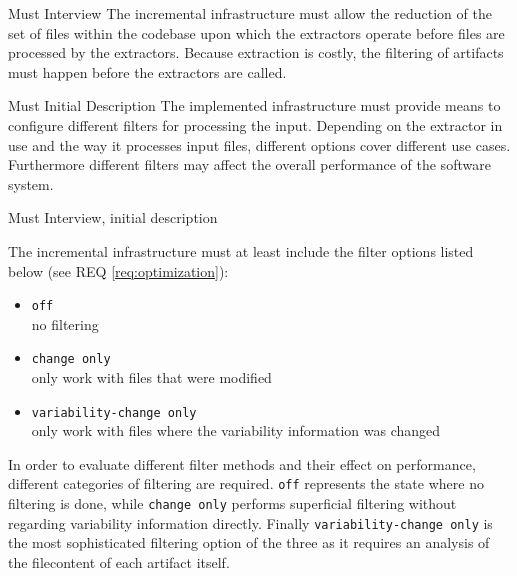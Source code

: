 \documentclass[a4paper]{article}
\begin{document}
\begin{req} \label{req:early-filtering}
\reqtable
	{Must}  {Interview}
	{The incremental infrastructure must allow the reduction of the set of files within the codebase upon which the extractors operate before files are processed by the extractors.}
	{Because extraction is costly, the filtering of artifacts must happen before the extractors are called.}

\begin{subreq} \label{req:optimization}
\reqtable
	{Must}  {Initial Description}
	{
	The implemented infrastructure must provide means to configure different filters for processing the input.
    }
	{Depending on the extractor in use and the way it processes input files, different options cover different use cases. Furthermore different filters may affect the overall performance of the software system.}
\end{subreq}

\begin{subreq}\label{req:mandatory-filters}
    \reqtable
	{Must}  {Interview, initial description}
	{
	The incremental infrastructure must at least include the filter options listed below (see REQ \ref{req:optimization}):
	\begin{itemize}
		\item \texttt{off} \\
		no filtering 
	    \item \texttt{change only} \\
	    only work with files that were modified
	    \item \texttt{variability-change only} \\
	     only work with files where the variability information was changed
	\end{itemize}
    }
	{In order to evaluate different filter methods and their effect on performance, different categories of filtering are required. \texttt{off} represents the state where no filtering is done, while \texttt{change only} performs superficial filtering without regarding variability information directly. Finally \texttt{variability-change only} is the most sophisticated filtering option of the three as it requires an analysis of the filecontent of each artifact itself.}
\end{subreq}


\end{req}
\end{document}
